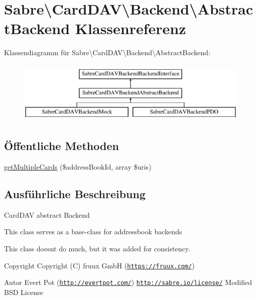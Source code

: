 \hypertarget{class_sabre_1_1_card_d_a_v_1_1_backend_1_1_abstract_backend}{}\section{Sabre\textbackslash{}Card\+D\+AV\textbackslash{}Backend\textbackslash{}Abstract\+Backend Klassenreferenz}
\label{class_sabre_1_1_card_d_a_v_1_1_backend_1_1_abstract_backend}
Klassendiagramm für Sabre\textbackslash{}Card\+D\+AV\textbackslash{}Backend\textbackslash{}Abstract\+Backend\+:\begin{figure}[H]
\begin{center}
\leavevmode
\includegraphics[height=3.000000cm]{class_sabre_1_1_card_d_a_v_1_1_backend_1_1_abstract_backend}
\end{center}
\end{figure}
\subsection*{Öffentliche Methoden}
\begin{DoxyCompactItemize}
\item 
\mbox{\hyperlink{class_sabre_1_1_card_d_a_v_1_1_backend_1_1_abstract_backend_a0a53af7f95121ca77c6081b9ac250ecf}{get\+Multiple\+Cards}} (\$address\+Book\+Id, array \$uris)
\end{DoxyCompactItemize}


\subsection{Ausführliche Beschreibung}
Card\+D\+AV abstract Backend

This class serves as a base-\/class for addressbook backends

This class doesn\textquotesingle{}t do much, but it was added for consistency.

\begin{DoxyCopyright}{Copyright}
Copyright (C) fruux GmbH (\href{https://fruux.com/}{\tt https\+://fruux.\+com/}) 
\end{DoxyCopyright}
\begin{DoxyAuthor}{Autor}
Evert Pot (\href{http://evertpot.com/}{\tt http\+://evertpot.\+com/})  \href{http://sabre.io/license/}{\tt http\+://sabre.\+io/license/} Modified B\+SD License 
\end{DoxyAuthor}


